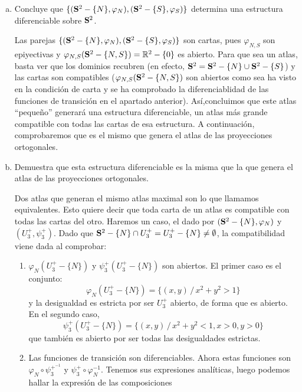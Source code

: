 \begin{ejer}
\begin{enumerate}[a)]
\begin{sol}
            \end{sol}
            \item Concluye que $\{(\bold S^2 -\{N\}, \varphi_N), (\bold S^2 -\{S\}, \varphi_S)\}$ determina una estructura diferenciable sobre $\bold S^2$. 
            \begin{sol}
               Las parejas $\{(\bold S^2 -\{N\}, \varphi_N), (\bold S^2 -\{S\}, \varphi_S)\}$ son cartas, pues $\varphi_{N,S}$ son epiyectivas y $\varphi_{N,S}(\bold S^2 -\{N,S\}) = \mathbb R^2 - \{0\}$ es abierto. Para que sea un atlas, basta ver que los dominios recubren (en efecto, $\bold S^2 = \bold S^2 -\{N\} \cup \bold S^2 -\{S\}$) y las cartas son compatibles ($\varphi_{N,S}(\bold S^2 -\{N,S\})$ son abiertos como sea ha visto en la condici\'on de carta y se ha comprobado la diferenciablidad de las funciones de transici\'on en el apartado anterior). As\'i,concluimos que este atlas ``pequeño'' generará una estructura diferenciable, un atlas más grande compatible con todas las cartas de esa estructura. A continuación, comprobaremos que es el mismo que genera el atlas de las proyecciones ortogonales.
            \end{sol}
            \item Demuestra que esta estructura diferenciable es la misma que la que genera el atlas de las proyecciones ortogonales.
            \begin{sol}
                Dos atlas que generan el mismo atlas maximal son lo que llamamos equivalentes. Esto quiere decir que toda carta de un atlas es compatible con todas las cartas del otro. Haremos un caso, el dado por $(\bold S^2 -\{N\}, \varphi_N)$ y $(U_3^+, \psi_3^+)$. Dado que $\bold S^2 -\{N\}\cap U_3^+ =U_3^+ -\{N\} \neq \emptyset$, la compatibilidad viene dada al comprobar:
                \begin{enumerate}[1)]
                    \item $\varphi_N (U_3^+ -\{N\})$ y $\psi_3^+(U_3^+ -\{N\})$ son abiertos. El primer caso es el conjunto:
                    $$\varphi_N (U_3^+ -\{N\}) = \{(x,y) \, / \, x^2 + y^2 > 1\}$$
                    y la desigualdad es estricta por ser $U_3^+$ abierto, de forma que es abierto. En el segundo caso, 
                    $$\psi_3^+ (U_3^+ -\{N\}) = \{(x,y) \, / \, x^2 + y^2 < 1, x > 0, y > 0\}$$
                    que tambi\'en es abierto por ser todas las desigualdades estrictas.
                    \item Las funciones de transici\'on son diferenciables. Ahora estas funciones son $\varphi_N \circ \psi_3^{+^{-1}}$ y $\psi_3^+ \circ \varphi_N^{-1}$. Tenemos sus expresiones anal\'iticas, luego podemos hallar la expresi\'on de las composiciones

\end{enumerate}
\end{sol}
\end{enumerate}
\end{ejer}
